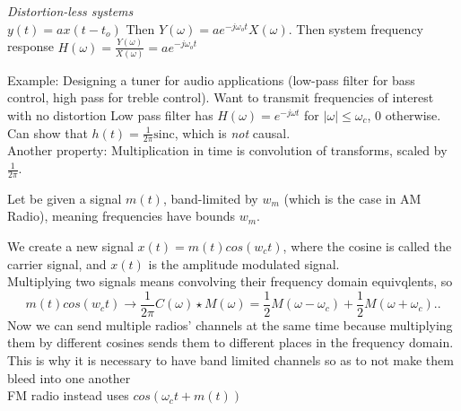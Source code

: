 \documentclass{article}
\begin{document}
\emph{Distortion-less systems} \\
$y(t)=ax(t-t_o)$ 
Then $Y(\omega)=ae^{-j\omega_o t}X(\omega)$.
Then system frequency response $H(\omega)=\frac{Y(\omega)}{X(\omega)}=ae^{-j \omega_o t}$ 

Example: Designing a tuner for audio applications (low-pass filter for bass control, high pass for treble control).
Want to transmit frequencies of interest with no distortion
Low pass filter has $H(\omega)=e^{-j\omega t}$ for $|\omega| \leq \omega_c$, 0 otherwise.
Can show that $h(t)=\frac{1}{2\pi}\text{sinc}$, which is \emph{not} causal.
\\
Another property: Multiplication in time is convolution of transforms, scaled by  $\frac{1}{2\pi}$.

Let be given a signal $m(t)$, band-limited by $w_m$ (which is the case in AM Radio), meaning frequencies have bounds $w_m$.

We create a new signal $x(t)=m(t)cos(w_c t)$, where the cosine is called the carrier signal, and $x(t)$ is the amplitude modulated signal. \\

Multiplying two signals means convolving their frequency domain equivqlents, so 
\[
m(t)cos(w_c t) \rightarrow \frac{1}{2\pi}C(\omega)\star M(\omega) =\frac{1}{2}M(\omega-\omega_c)+\frac{1}{2}M(\omega+\omega_c).
.\]
Now we can send multiple radios' channels at the same time because multiplying them by different cosines sends them to different places in the frequency domain. This is why it is necessary to have band limited channels so as to not make them bleed into one another \\
FM radio instead uses $cos(\omega_c t + m(t))$
\end{document}
